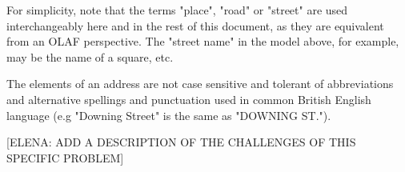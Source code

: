 For simplicity, note that the terms "place", "road" or "street" are used interchangeably here and in the rest of this document, as they are equivalent from an OLAF perspective. The "street name" in the model above, for example, may be the name of a square, etc.

The elements of an address are not case sensitive and tolerant of abbreviations and alternative spellings and punctuation used in common British English language (e.g "Downing Street" is the same as "DOWNING ST.").

[ELENA: ADD A DESCRIPTION OF THE CHALLENGES OF THIS SPECIFIC PROBLEM]

